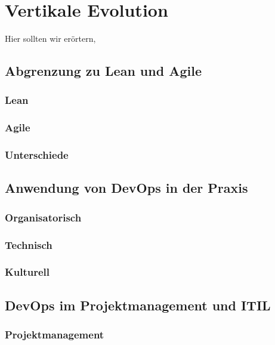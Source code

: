 \chapter{Vertikale Evolution} %

Hier sollten wir erörtern,

\section{Abgrenzung zu Lean und Agile} %

\subsection{Lean}

\subsection{Agile}

\subsection{Unterschiede}


\section{Anwendung von DevOps in der Praxis} %

\subsection{Organisatorisch}

\subsection{Technisch}

\subsection{Kulturell}


\section{DevOps im Projektmanagement und ITIL} %

\subsection{Projektmanagement}

